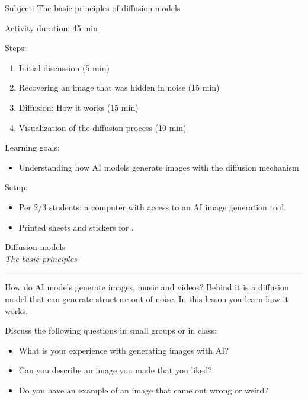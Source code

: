 \documentclass[12pt]{article}
\newcounter{exercise}
\newcommand{\exercisetitle}[2][]{%
  \refstepcounter{exercise}%
  \vspace{0.5cm}%
  \colorbox{maincolor}{%
    \makebox[\dimexpr\linewidth-2\fboxsep][l]{%
      \textcolor{white}{\faPen\ Assignment \theexercise:~ #2}%
    }%
  }%
  \if\relax\detokenize{#1}\relax\else\label{#1}\fi
  \vspace{0.3cm}%
}
\newcounter{question}
\begin{document}
\vspace*{0.5\textheight}

Subject: The basic principles of diffusion models

Activity duration: 45 min

\vspace{0.5cm}

Steps:
\begin{enumerate}
\item Initial discussion (5 min)
  \item Recovering an image that was hidden in noise (15 min)
  \item Diffusion: How it works (15 min)
  \item Visualization of the diffusion process (10 min)
\end{enumerate}

Learning goals:

\begin{itemize}
  \item Understanding how AI models generate images with the diffusion mechanism
\end{itemize}

Setup:
\begin{itemize}
  \item Per 2/3 students: a computer with access to an AI image generation tool. 
  \item Printed sheets and stickers for .
\end{itemize}
\newpage

\begin{center}
    {\Huge \color{maincolor} Diffusion models}\\[5pt]
    {\large \textit{The basic principles}}\\
    \rule{\linewidth}{1pt}
\end{center}

\vspace{0.5cm}

How do AI models generate images, music and videos? Behind it is a diffusion model that can generate structure out of noise. In this lesson you learn how it works.

\exercisetitle{Initial discusssion}

Discuss the following questions in small groups or in class: 
\begin{itemize}
    \item What is your experience with generating images with AI?
    \item Can you describe an image you made that you liked?
    \item Do you have an example of an image that came out wrong or weird?
\end{itemize}
\end{document}
